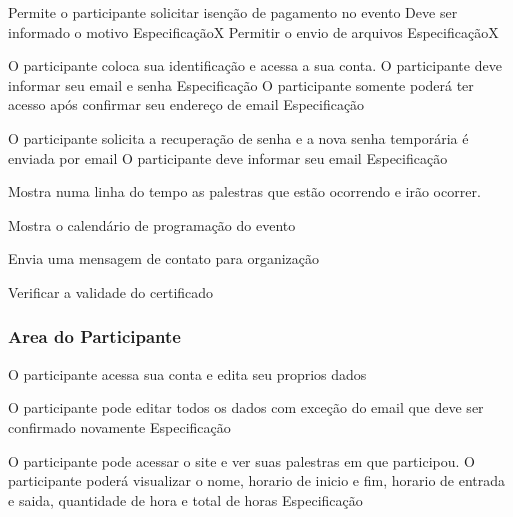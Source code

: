 \documentclass[12pt,a4paper]{article}
\begin{document}
				{Permite o participante solicitar isenção de pagamento no evento}
				{%
					  {Deve ser informado o motivo}
					  {Especificação}{}{X}%
					  {Permitir o envio de arquivos}
					  {Especificação}{}{X}%
				}
				
				{O participante coloca sua identificação e acessa a sua conta.}
				{%
					  {O participante deve informar seu email e senha}
					  {Especificação}{}{}%
					  {O participante somente poderá ter acesso após confirmar seu endereço de email}
					  {Especificação}{}{}%
				}
				
										
				{O participante solicita a recuperação de senha e a nova senha temporária é enviada por email}
				{%
					  {O participante deve informar seu email}
					  {Especificação}{}{}%
				}
				
				{Mostra numa linha do tempo as palestras que estão ocorrendo e irão ocorrer.}
				{%
				
				}
				
				{Mostra o calendário de programação do evento}
				{%
				
				}
				
				{Envia uma mensagem de contato para organização}
				{%
				
				}
				
				{Verificar a validade do certificado}
				{%
				
				}
			
			\clearpage
			\subsubsection{Area do Participante}
			
				{O participante acessa sua conta e edita seu proprios dados}
				{%
					  {O participante pode editar todos os dados com exceção do email que deve ser confirmado novamente}
					  {Especificação}{}{}%
				
				}
				
				{O participante pode acessar o site e ver suas palestras em que participou.}
				{%
						{O participante poderá visualizar o nome, horario de inicio e fim, horario de entrada e saida, quantidade de hora e total de horas}
						{Especificação}{}{}%
				}
			
\end{document}
